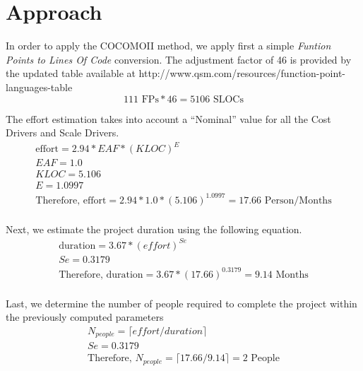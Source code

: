 \section{Approach}

In order to apply the COCOMOII method, we apply first a simple \textit{Funtion Points to Lines Of Code}
conversion. The adjustment factor of 46 is provided by the updated table available at 
http://www.qsm.com/resources/function-point-languages-table
\begin{equation}
 111 \text{ FPs} * 46 = 5106 \text{ SLOCs}
\end{equation}

The effort estimation takes into account a ``Nominal'' value for all the Cost Drivers and Scale Drivers.
\begin{multline}
 \text{effort} = 2.94 * \textit{EAF} * (\textit{KLOC})^E \\
 \textit{EAF} = 1.0 \\
 \textit{KLOC} = 5.106 \\
 E = 1.0997 \\
 \text{Therefore, effort} = 2.94 * 1.0 * (5.106)^{1.0997} = 17.66 \text{ Person/Months} \\
\end{multline}

Next, we estimate the project duration using the following equation.
\begin{multline}
 \text{duration} = 3.67 * (\textit{effort})^\textit{Se} \\
 \textit{Se} = 0.3179 \\
 \text{Therefore, duration} = 3.67 * (17.66)^{0.3179} = 9.14 \text{ Months} \\
\end{multline}

Last, we determine the number of people required to complete the project within
the previously computed parameters
\begin{multline}
 N_{\textit{people}} = \lceil \textit{effort} / \textit{duration} \rceil \\
 \textit{Se} = 0.3179 \\
 \text{Therefore, } N_{\textit{people}} = \lceil 17.66 / 9.14 \rceil = 2 \text{ People} \\
\end{multline}

